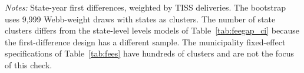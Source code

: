 \begin{table}[H]\centering
\caption{\textbf{Few-cluster inference for the fee-shock specification}}
\label{tab:fewcluster}
\small
\small\setlength{\tabcolsep}{4pt}
\begin{minipage}{\linewidth}\footnotesize
\textit{Notes:} State-year first differences, weighted by TISS deliveries. The bootstrap uses 9,999 Webb-weight draws with states as clusters. The number of state clusters differs from the state-level levels models of Table~\ref{tab:feegap_ci} because the first-difference design has a different sample. The municipality fixed-effect specifications of Table~\ref{tab:fees} have hundreds of clusters and are not the focus of this check.
\end{minipage}
\end{table}
